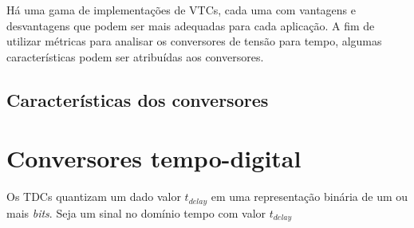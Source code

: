 \documentclass[
	12pt,				%
	openright,			%
	twoside,			%
	a4paper,			%
	english,			%
	french,				%
	spanish,			%
	brazil,				%
	]{abntex2}
\begin{document}
			Há uma gama de implementações de VTCs, cada uma com vantagens e desvantagens que podem ser mais adequadas para cada aplicação. A fim de utilizar métricas para analisar os conversores de tensão para tempo, algumas características podem ser atribuídas aos conversores.

		\subsection{Características dos conversores}


	\section{Conversores tempo-digital}
		Os TDCs quantizam um dado valor $t_{delay}$ em uma representação binária de um ou mais \textit{bits}. Seja um sinal no domínio tempo com valor $t_{delay}$
			

		

	

\end{document}
